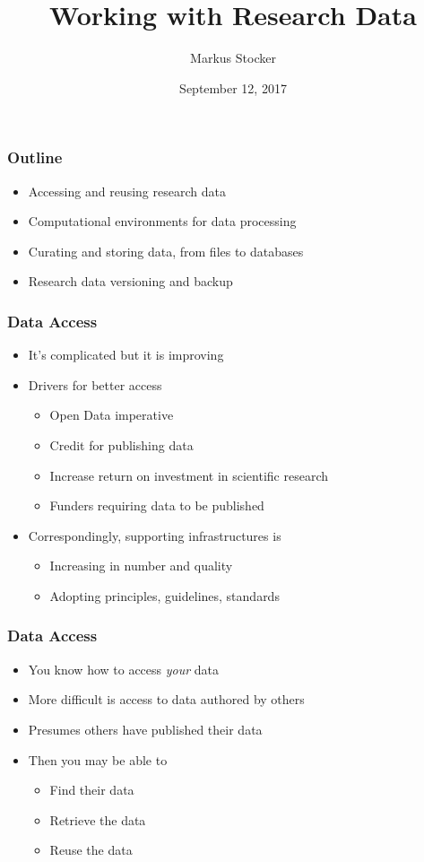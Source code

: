 \documentclass{beamer}
\title{Working with Research Data}
\author{Markus Stocker}
\date{September 12, 2017}
\begin{document}
\maketitle

\begin{frame}
  \frametitle{Outline}
  
  \begin{itemize}
  \item Accessing and reusing research data
  \item Computational environments for data processing
  \item Curating and storing data, from files to databases
  \item Research data versioning and backup
  \end{itemize}
\end{frame}

\begin{frame}
  \frametitle{Data Access}
  
  \begin{itemize}
  \item It's complicated but it is improving
  \item Drivers for better access
  \begin{itemize}
  \item Open Data imperative
  \item Credit for publishing data
  \item Increase return on investment in scientific research
  \item Funders requiring data to be published
  \end{itemize}
  \item Correspondingly, supporting infrastructures is
  \begin{itemize}
  \item Increasing in number and quality
  \item Adopting principles, guidelines, standards
  \end{itemize}
  \end{itemize}
\end{frame}

\begin{frame}
  \frametitle{Data Access}
  
  \begin{itemize}
  \item You know how to access \emph{your} data
  \item More difficult is access to data authored by others
  \item Presumes others have published their data
  \item Then you may be able to
  \begin{itemize}
  \item Find their data
  \item Retrieve the data
  \item Reuse the data
  \end{itemize}
  \end{itemize}
\end{frame}
\end{document}
